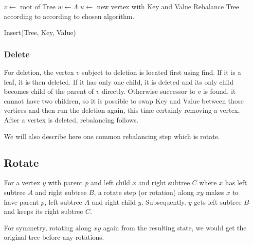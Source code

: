 \begin{algorithm}
	\small
	\SetAlgoLined
	$v \gets $ root of Tree\;
	$w \gets \Lambda$\;
	$u \gets $ new vertex with Key and Value\;
	Rebalance Tree according to according to chosen algorithm.
	\caption{Insert(Tree, Key, Value)}
\end{algorithm}

\subsubsection*{Delete}
For deletion, the vertex $v$ subject to deletion is located first using find. If it is a leaf, it is then deleted. If it has only one child, it is deleted and its only child becomes child of the parent of $v$ directly. Otherwise successor to $v$ is found, it cannot have two children, so it is possible to swap Key and Value between those vertices and then run the deletion again, this time certainly removing a vertex. After a vertex is deleted, rebalancing follows.


We will also describe here one common rebalancing step which is rotate.

\subsection*{Rotate}

For a vertex $y$ with parent $p$ and left child $x$ and right subtree $C$ where $x$ has left subtree $A$ and right subtree $B$, a rotate step (or rotation) along $xy$ makes $x$ to have parent $p$, left subtree $A$ and right child $y$. Subsequently, $y$ gets left subtree $B$ and keeps its right subtree $C$.

For symmetry, rotating along $xy$ again from the resulting state, we would get the original tree before any rotations.


